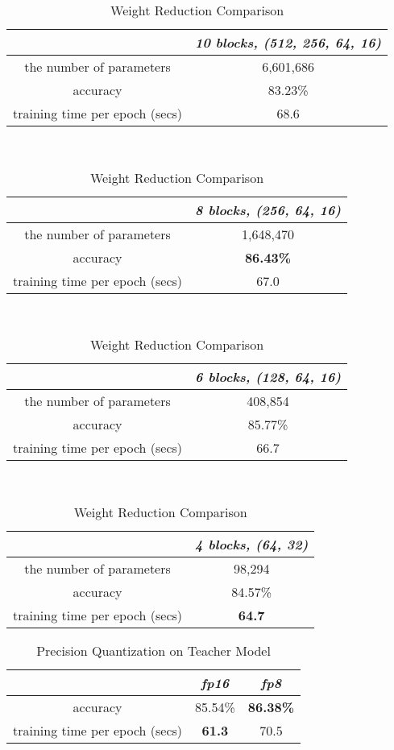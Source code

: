 \begin{table}[ht]
\centering
\caption{Weight Reduction Comparison}
\label{tab:weight_reduction}
\begin{tabular}{|c|c|}
    \hline
                            & \textit{10 blocks, (512, 256, 64, 16)} \\
    \hline
    the number of parameters & 6,601,686 \\
    \hline
    accuracy                & 83.23\% \\
    \hline
    training time per epoch (secs) & 68.6 \\
    \hline
\end{tabular}
\\[10pt]
\begin{tabular}{|c|c|}
    \hline
                            & \textit{8 blocks, (256, 64, 16)} \\
    \hline
    the number of parameters & 1,648,470 \\
    \hline
    accuracy                & \textbf{86.43\%} \\
    \hline
    training time per epoch (secs) & 67.0 \\
    \hline
\end{tabular}
\\[10pt]
\begin{tabular}{|c|c|}
    \hline
                            & \textit{6 blocks, (128, 64, 16)} \\
    \hline
    the number of parameters & 408,854 \\
    \hline
    accuracy                & 85.77\% \\
    \hline
    training time per epoch (secs) & 66.7 \\
    \hline
\end{tabular}
\\[10pt]
\begin{tabular}{|c|c|}
    \hline
                            & \textit{4 blocks, (64, 32)} \\
    \hline
    the number of parameters & 98,294 \\
    \hline
    accuracy                & 84.57\% \\
    \hline
    training time per epoch (secs) & \textbf{64.7} \\
    \hline
\end{tabular}
\end{table}

\begin{table}[ht]
\centering
\caption{Precision Quantization on Teacher Model}
\label{tab:precision_quantization}
\begin{tabular}{|c|c|c|}
\hline
                          & \textit{fp16}           & \textit{fp8}     \\ \hline
accuracy                  & 85.54\%                 & \textbf{86.38\%}    \\ \hline
training time per epoch (secs) & \textbf{61.3}            & 70.5      \\ \hline
\end{tabular}
\end{table}

